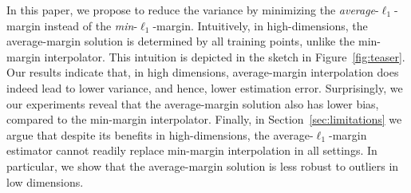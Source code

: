 In this paper, we propose to reduce the variance by minimizing the
\emph{average}-$\ell_1$-margin instead of the \emph{min}-$\ell_1$-margin.
Intuitively, in high-dimensions, the average-margin solution is determined by
all training points, unlike the min-margin interpolator. This intuition is
depicted in the sketch in Figure~\ref{fig:teaser}. Our results indicate that, in
high dimensions, average-margin interpolation does indeed lead to lower
variance, and hence, lower estimation error. Surprisingly, we our experiments
reveal that the average-margin solution also has lower bias, compared to the
min-margin interpolator.  Finally, in Section~\ref{sec:limitations} we argue
that despite its benefits in high-dimensions, the average-$\ell_1$-margin
estimator cannot readily replace min-margin interpolation in all settings. In
particular, we show that the average-margin solution is less robust to outliers
in low dimensions.






